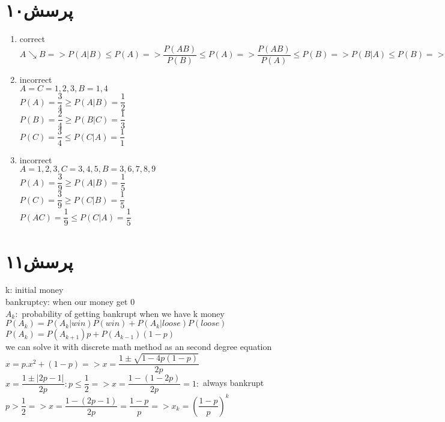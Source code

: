 \documentclass[a4paper]{article}
\begin{document}
\section*{پرسش۱۰}
\begin{latin}
\begin{enumerate}
\item{}
correct \\
$ A \searrow B => P(A|B) \leq P(A) => \dfrac{P(AB)}{P(B)} \leq P(A) => \dfrac{P(AB)}{P(A)} \leq P(B) => P(B|A) \leq P(B) => B \searrow A $
\item{}
incorrect\\
$ A = C = {1,2,3}, B = {1,4}$\\
$ P(A) = \dfrac{3}{4} \geq P(A|B) = \dfrac{1}{2}  $\\
$ P(B) = \dfrac{2}{4} \geq P(B|C) = \dfrac{1}{3}  $\\
$ P(C) = \dfrac{3}{4} \leq P(C|A) = \dfrac{1}{1}  $\\
\item{}
incorrect\\
$ A = {1,2,3},  C = {3,4,5}, B = {3,6,7,8,9}$\\
$ P(A) = \dfrac{3}{9} \geq P(A|B) = \dfrac{1}{5}  $\\
$ P(C) = \dfrac{3}{9} \geq P(C|B) = \dfrac{1}{5}  $\\
$ P(AC) = \dfrac{1}{9} \leq P(C|A) = \dfrac{1}{5}  $\\

\end{enumerate}
\end{latin}

\pagebreak
\section*{پرسش۱۱}
\begin{latin}
k: initial money\\
bankruptcy: when our money get 0\\
$A_k:$ probability of getting bankrupt when we have k money\\
$ P(A_k) = P(A_k|win)P(win) + P(A_k|loose)P(loose)$\\
$P(A_k) = P(A_{k+1})p + P(A_{k-1})(1-p)$\\
we can solve it with discrete math method as an second degree equation\\
$x = p.x^2 + (1-p) => x = \dfrac{1 \pm \sqrt{1 - 4p(1-p)}}{2p}$\\
$x = \dfrac{1 \pm |2p-1|}{2p}: p \leq \dfrac{1}{2} => x = \dfrac{1 - (1-2p)}{2p} = 1:$ always bankrupt\\
$p > \dfrac{1}{2} => x = \dfrac{1 - (2p-1)}{2p} = \dfrac{1-p}{p} => x_k = (\dfrac{1-p}{p})^k$
\end{latin}
\end{document}
